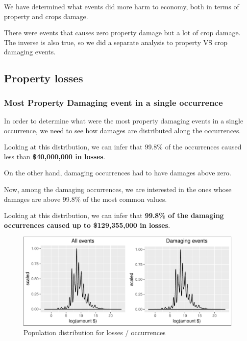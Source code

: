 \documentclass[]{article}
\begin{document}
We have determined what events did more harm to economy, both in terms
of property and crops damage.

There were events that causes zero property damage but a lot of crop
damage. The inverse is also true, so we did a separate analysis to
property VS crop damaging events.

\subsection{Property losses}\label{property-losses}

\subsubsection{Most Property Damaging event in a single
occurrence}\label{most-property-damaging-event-in-a-single-occurrence}

In order to determine what were the most property damaging events in a
single occurrence, we need to see how damages are distributed along the
occurrences.

Looking at this distribution, we can infer that 99.8\% of the
occurrences caused less than \textbf{\$40,000,000 in losses}.

On the other hand, damaging occurrences had to have damages above zero.

Now, among the damaging occurrences, we are interested in the ones whose
damages are above 99.8\% of the most common values.

Looking at this distribution, we can infer that \textbf{99.8\% of the
damaging occurrences caused up to \$129,355,000 in losses}.

\begin{figure}[htbp]
\centering
\includegraphics{readme_files/figure-latex/crop-distribution-1.pdf}
\caption{Population distribution for losses / occurrences}
\end{figure}
\end{document}
